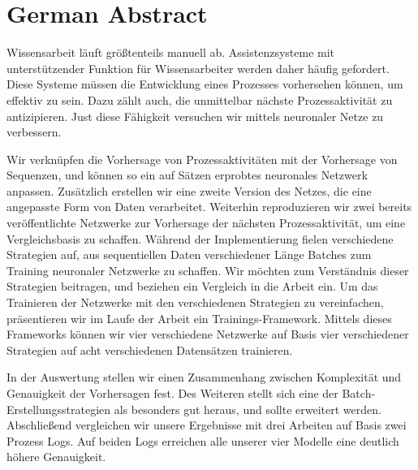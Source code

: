 \chapter*{German Abstract}
Wissensarbeit läuft größtenteils manuell ab.
Assistenzsysteme mit unterstützender Funktion für Wissensarbeiter werden daher häufig gefordert.
Diese Systeme müssen die Entwicklung eines Prozesses vorhersehen können, um effektiv zu sein.
Dazu zählt auch, die unmittelbar nächste Prozessaktivität zu antizipieren.
Just diese Fähigkeit versuchen wir mittels neuronaler Netze zu verbessern.

Wir verknüpfen die Vorhersage von Prozessaktivitäten mit der Vorhersage von Sequenzen, und können so ein auf Sätzen erprobtes neuronales Netzwerk anpassen.
Zusätzlich erstellen wir eine zweite Version des Netzes, die eine angepasste Form von Daten verarbeitet.
Weiterhin reproduzieren wir zwei bereits veröffentlichte Netzwerke zur Vorhersage der nächsten Prozessaktivität, um eine Vergleichsbasis zu schaffen.
Während der Implementierung fielen verschiedene Strategien auf, aus sequentiellen Daten verschiedener Länge Batches zum Training neuronaler Netzwerke zu schaffen.
Wir möchten zum Verständnis dieser Strategien beitragen, und beziehen ein Vergleich in die Arbeit ein.
Um das Trainieren der Netzwerke mit den verschiedenen Strategien zu vereinfachen, präsentieren wir im Laufe der Arbeit ein Trainings-Framework.
Mittels dieses Frameworks können wir vier verschiedene Netzwerke auf Basis vier verschiedener Strategien auf acht verschiedenen Datensätzen trainieren.

In der Auswertung stellen wir einen Zusammenhang zwischen Komplexität und Genauigkeit der Vorhersagen fest.
Des Weiteren stellt sich eine der Batch-Erstellungsstrategien als besonders gut heraus, und sollte erweitert werden.
Abschließend vergleichen wir unsere Ergebnisse mit drei Arbeiten auf Basis zwei Prozess Logs.
Auf beiden Logs erreichen alle unserer vier Modelle eine deutlich höhere Genauigkeit.

\endgroup

\vfill
